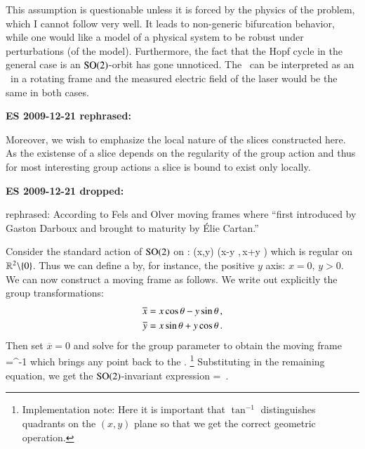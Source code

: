 This assumption is questionable unless it
is forced by the physics of the problem, which I cannot
follow very well. It leads to non-generic bifurcation
behavior, while one would like a model of a physical system
to be robust under perturbations (of the model). Furthermore,
the fact that the Hopf cycle in the general case is an
$\textrm{SO}(2)$-orbit has gone unnoticed. The \reqv\ can be
interpreted as an \eqv\ in a rotating frame and the measured
electric field of the laser would be the same in both cases.

{\bf ES 2009-12-21 rephrased:}

Moreover, we wish to emphasize the local nature
of the slices constructed here. As the existense of a slice
depends on the regularity of the group action
and thus for most interesting group actions a slice is bound to
exist only locally.

{\bf ES 2009-12-21 dropped:}

rephrased: According to Fels and Olver
moving frames where ``first introduced by Gaston Darboux
and brought to maturity by \'Elie Cartan.'' 


\begin{example}
Consider the standard action of $\textrm{SO}(2)$ on :
\beq
	(x,y) \mapsto (x\cos\theta -y \sin\theta,\,x\sin\theta +y \cos\theta )
\eeq
which is regular on $\mathbb{R}^{2}\backslash\{0\}$. Thus we can define
a {\csection} by, for instance, the
positive $y$ axis: $x=0,\,y>0$.
We can now construct a moving frame as follows. We write out
explicitly the group transformations:
\begin{subequations}
\begin{align}
 	\overline{x} &= x \cos\theta - y \sin\theta\label{eq:explSO2stnd1}\,, \\ 
	\overline{y} &= x \sin\theta + y \cos\theta\label{eq:explSO2stnd2}\,.
\end{align}
\end{subequations}
Then set $\overline{x}=0$ and solve  for the group
parameter to obtain the moving frame
\beq
	\theta=\tan^{-1}
	\label{eq:SO2stndMF}
\eeq
which brings any point  back to the {\csection}.
\footnote{Implementation note: Here it is important that
$\tan^{-1}$ distinguishes quadrants on the $(x,y)$ plane so
that we get the correct geometric operation.}
Substituting  in the remaining equation,
we get the $\textrm{SO}(2)$-invariant expression
\beq
	 = \,.
\eeq
\end{example}

